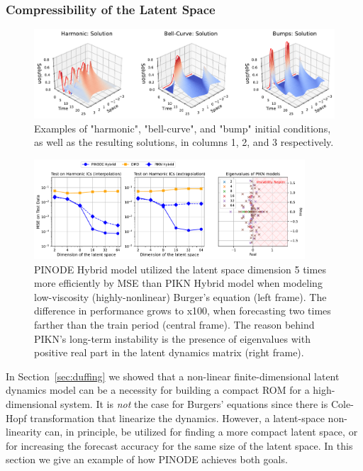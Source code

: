 \subsubsection{Compressibility of the Latent Space}

\begin{figure}
    \centering
    \includegraphics[width=\textwidth]{figures/burgers_examples_of_ics.pdf}
    \caption{Examples of "harmonic", "bell-curve", and "bump" initial conditions, as well as the resulting solutions, in columns 1, 2, and 3 respectively.}
    \label{fig:burgers_examples_of_ics}
\end{figure}

\label{sec:compressibility}
\begin{figure}[t]
    \centering
    \includegraphics[width=0.9\textwidth]{figures/compressibility.pdf}
    \caption{PINODE Hybrid model utilized the latent space dimension 5 times more efficiently by MSE than PIKN Hybrid model when modeling low-viscosity (highly-nonlinear) Burger's equation (left frame). The difference in performance grows to x100, when forecasting two times farther than the train period (central frame). The reason behind PIKN's long-term instability is the presence of eigenvalues with positive real part in the latent dynamics matrix (right frame).}
    \label{fig:burgers_compressibility}
\end{figure}

In Section~\ref{sec:duffing} we showed that a non-linear finite-dimensional latent dynamics model can be a necessity for building a compact ROM for a high-dimensional system. It is \textit{not} the case for Burgers' equations since there is Cole-Hopf transformation that linearize the dynamics. However, a latent-space non-linearity can, in principle, be utilized for finding a more compact latent space, or for increasing the forecast accuracy for the same size of the latent space. In this section we give an example of how PINODE achieves both goals. 

